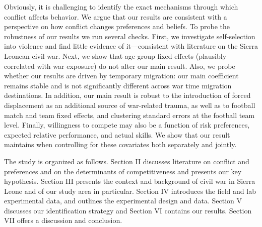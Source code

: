 Obviously, it is challenging to identify the exact mechanisms through which conflict affects behavior. We argue that our results are consistent with a perspective on how conflict changes preferences and beliefs. To probe the robustness of our results we run several checks. First, we investigate self-selection into violence and find little evidence of it—consistent with literature on the Sierra Leonean civil war. Next, we show that age-group fixed effects (plausibly correlated with war exposure) do not alter our main result. Also, we probe whether our results are driven by temporary migration: our main coefficient remains stable and is not significantly different across war time migration destinations. In addition, our main result is robust to the introduction of forced displacement as an additional source of war-related trauma, as well as to football match and team fixed effects, and clustering standard errors at the football team level. Finally, willingness to compete may also be a function of risk preferences, expected relative performance, and actual skills. We show that our result maintains when controlling for these covariates both separately and jointly.

The study is organized as follows. Section II discusses literature on conflict and preferences and on the determinants of competitiveness and presents our key hypothesis. Section III presents the context and background of civil war in Sierra Leone and of our study area in particular. Section IV introduces the field and lab experimental data, and outlines the experimental design and data. Section V discusses our identification strategy and Section VI contains our results. Section VII offers a discussion and conclusion. 

